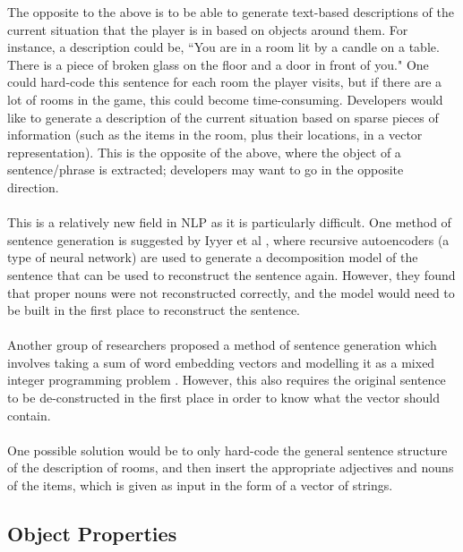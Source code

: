 \documentclass[11pt]{article}
\begin{document}
The opposite to the above is to be able to generate text-based descriptions of the current situation that the player is in based on objects around them. For instance, a description could be, ``You are in a room lit by a candle on a table. There is a piece of broken glass on the floor and a door in front of you." One could hard-code this sentence for each room the player visits, but if there are a lot of rooms in the game, this could become time-consuming. Developers would like to generate a description of the current situation based on sparse pieces of information (such as the items in the room, plus their locations, in a vector representation). This is the opposite of the above, where the object of a sentence/phrase is extracted; developers may want to go in the opposite direction.
\\
\\
This is a relatively new field in NLP as it is particularly difficult. One method of sentence generation is suggested by Iyyer et al \cite{RefWorks:55}, where recursive autoencoders (a type of neural network) are used to generate a decomposition model of the sentence that can be used to reconstruct the sentence again. However, they found that proper nouns were not reconstructed correctly, and the model would need to be built in the first place to reconstruct the sentence.
\\
\\
Another group of researchers proposed a method of sentence generation which involves taking a sum of word embedding vectors and modelling it as a mixed integer programming problem \cite{RefWorks:54}. However, this also requires the original sentence to be de-constructed in the first place in order to know what the vector should contain.
\\
\\
One possible solution would be to only hard-code the general sentence structure of the description of rooms, and then insert the appropriate adjectives and nouns of the items, which is given as input in the form of a vector of strings.

\subsection{Object Properties}
\end{document}
